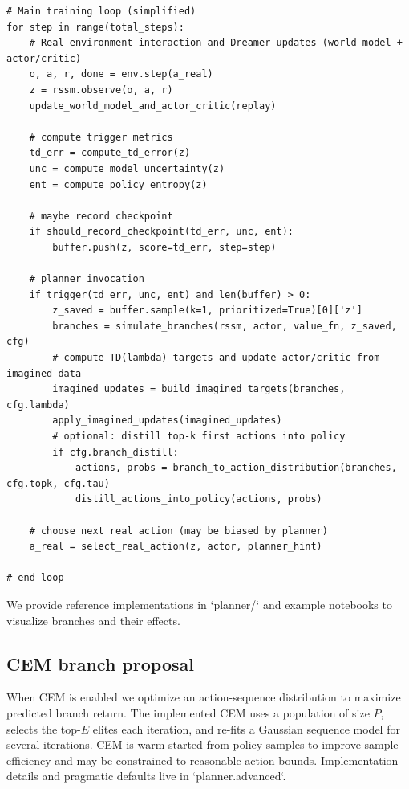 \documentclass{article}
\begin{document}
\begin{verbatim}
# Main training loop (simplified)
for step in range(total_steps):
    # Real environment interaction and Dreamer updates (world model + actor/critic)
    o, a, r, done = env.step(a_real)
    z = rssm.observe(o, a, r)
    update_world_model_and_actor_critic(replay)

    # compute trigger metrics
    td_err = compute_td_error(z)
    unc = compute_model_uncertainty(z)
    ent = compute_policy_entropy(z)

    # maybe record checkpoint
    if should_record_checkpoint(td_err, unc, ent):
        buffer.push(z, score=td_err, step=step)

    # planner invocation
    if trigger(td_err, unc, ent) and len(buffer) > 0:
        z_saved = buffer.sample(k=1, prioritized=True)[0]['z']
        branches = simulate_branches(rssm, actor, value_fn, z_saved, cfg)
        # compute TD(lambda) targets and update actor/critic from imagined data
        imagined_updates = build_imagined_targets(branches, cfg.lambda)
        apply_imagined_updates(imagined_updates)
        # optional: distill top-k first actions into policy
        if cfg.branch_distill:
            actions, probs = branch_to_action_distribution(branches, cfg.topk, cfg.tau)
            distill_actions_into_policy(actions, probs)

    # choose next real action (may be biased by planner)
    a_real = select_real_action(z, actor, planner_hint)

# end loop
\end{verbatim}

We provide reference implementations in `planner/` and example notebooks to
visualize branches and their effects.

\subsection{CEM branch proposal}
When CEM is enabled we optimize an action-sequence distribution to maximize
predicted branch return. The implemented CEM uses a population of size
\(P\), selects the top-\(E\) elites each iteration, and re-fits a Gaussian
sequence model for several iterations. CEM is warm-started from policy samples
to improve sample efficiency and may be constrained to reasonable action bounds.
Implementation details and pragmatic defaults live in `planner.advanced`.
\end{document}
